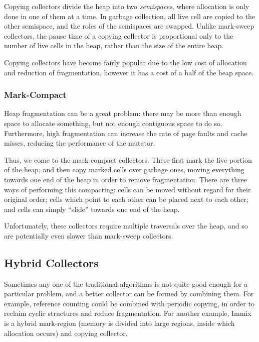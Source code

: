 Copying collectors divide the heap into two \textit{semispaces}, where
allocation is only done in one of them at a time. In garbage
collection, all live \gls{cell} are copied to the other semispace, and
the roles of the semispaces are swapped\cite{Fenichel69}. Unlike
mark-sweep collectors, the pause time of a copying collector is
proportional only to the number of live \glspl{cell} in the heap,
rather than the size of the entire heap.

Copying collectors have become fairly popular due to the low cost of
allocation and reduction of fragmentation, however it has a cost of a
half of the heap space\cite{GarbageCollection}.

\subsubsection{Mark-Compact}

Heap \gls{fragmentation} can be a great problem: there may be more
than enough space to allocate something, but not enough contiguous
space to do so. Furthermore, high fragmentation can increase the rate
of page faults and cache misses, reducing the performance of the
mutator.

Thus, we come to the mark-compact collectors. These first mark the
live portion of the heap, and then copy marked \glspl{cell} over
garbage ones, moving everything towards one end of the heap in order
to remove fragmentation. There are three ways of performing this
compacting: \glspl{cell} can be moved without regard for their
original order; \glspl{cell} which point to each other can be placed
next to each other; and \glspl{cell} can simply ``slide'' towards one
end of the heap.

Unfortunately, these collectors require multiple traversals over the
heap, and so are potentially even slower than mark-sweep
collectors\cite{GarbageCollection}.

\subsection{Hybrid Collectors}

Sometimes any one of the traditional algorithms is not quite good
enough for a particular problem, and a better collector can be formed
by combining them. For example, reference counting could be combined
with periodic copying, in order to reclaim cyclic structures and
reduce fragmentation. For another example, Immix\cite{Blackburn08} is
a hybrid mark-region (memory is divided into large regions, inside
which allocation occurs) and copying collector.

